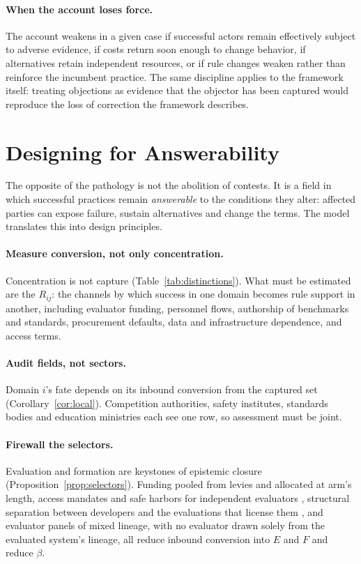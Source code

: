 \documentclass[letterpaper]{article} %
\theoremstyle{definition}
\begin{document}
\paragraph{When the account loses force.} The account weakens in a given case if successful actors remain effectively subject to adverse evidence, if costs return soon enough to change behavior, if alternatives retain independent resources, or if rule changes weaken rather than reinforce the incumbent practice. The same discipline applies to the framework itself: treating objections as evidence that the objector has been captured would reproduce the loss of correction the framework describes.

\section{Designing for Answerability}\label{sec:design}

The opposite of the pathology is not the abolition of contests. It is a field in which successful practices remain \emph{answerable} to the conditions they alter: affected parties can expose failure, sustain alternatives and change the terms. The model translates this into design principles.

\paragraph{Measure conversion, not only concentration.} Concentration is not capture (Table~\ref{tab:distinctions}). What must be estimated are the $R_{ij}$: the channels by which success in one domain becomes rule support in another, including evaluator funding, personnel flows, authorship of benchmarks and standards, procurement defaults, data and infrastructure dependence, and access terms.

\paragraph{Audit fields, not sectors.} Domain $i$'s fate depends on its inbound conversion from the captured set (Corollary~\ref{cor:local}). Competition authorities, safety institutes, standards bodies and education ministries each see one row, so assessment must be joint.

\paragraph{Firewall the selectors.} Evaluation and formation are keystones of epistemic closure (Proposition~\ref{prop:selectors}). Funding pooled from levies and allocated at arm's length, access mandates and safe harbors for independent evaluators \citep{longpre2024}, structural separation between developers and the evaluations that license them \citep{khan2019,narechania2024}, and evaluator panels of mixed lineage, with no evaluator drawn solely from the evaluated system's lineage, all reduce inbound conversion into $E$ and $F$ and reduce $\beta$.
\end{document}
